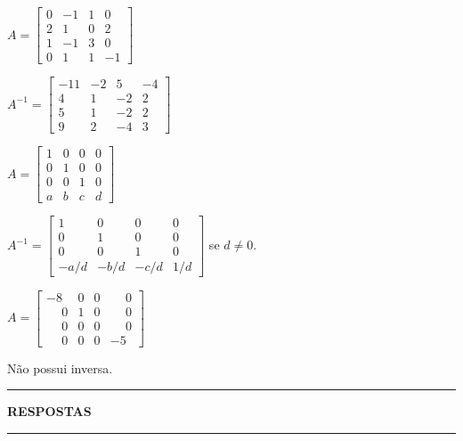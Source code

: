 \documentclass[12pt]{exam}
\begin{document}
\begin{exercicio}
    $
    A = \begin{bmatrix}
        0 & -1 & 1 & 0\\
        2 & 1 & 0 & 2\\
        1 & -1 & 3 & 0\\
        0 & 1 & 1 & -1
    \end{bmatrix}
    $
    \begin{solucao}
        $
        A^{-1} = \begin{bmatrix}
            -11 & -2 & 5 & -4\\
            4 & 1 & -2 & 2\\
            5 & 1 & -2 & 2\\
            9 & 2 & -4 & 3
        \end{bmatrix}
        $
    \end{solucao}
\end{exercicio}

\begin{exercicio}
    $
    A = \begin{bmatrix}
        1 & 0 & 0 & 0\\
        0 & 1 & 0 & 0\\
        0 & 0 & 1 & 0\\
        a & b & c & d
    \end{bmatrix}
    $
    \begin{solucao}
        $
        A^{-1} = \begin{bmatrix}
            1 & 0 & 0 & 0\\
            0 & 1 & 0 & 0\\
            0 & 0 & 1 & 0\\
            -a/d & -b/d & -c/d & 1/d
        \end{bmatrix}
        $
        se $d \ne 0$.
    \end{solucao}
\end{exercicio}

\begin{exercicio}\label{matrizinversafim}
    $
    A =\begin{bmatrix}
        -8 & 0 & 0 & \phantom{-} 0\\
        \phantom{-} 0 & 1 & 0 & \phantom{-} 0\\
        \phantom{-} 0 & 0 & 0 & \phantom{-} 0\\
        \phantom{-} 0 & 0 & 0 & -5
    \end{bmatrix}
    $
    \begin{solucao}
        Não possui inversa.
    \end{solucao}
\end{exercicio}

\newpage
{}
\hrule
\begin{center}
{\large\bf RESPOSTAS}
\end{center}
\hrule

\end{document}
